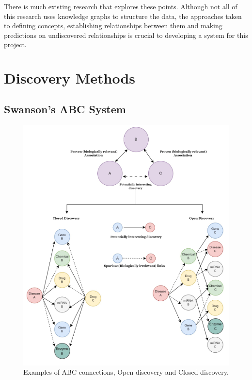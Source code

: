 \documentclass{l4proj}
\begin{document}
There is much existing research that explores these points. Although not all of this research uses knowledge graphs to structure the data, the approaches taken to defining concepts, establishing relationships between them and making predictions on undiscovered relationships is crucial to developing a system for this project. \\

\section{Discovery Methods}

\subsection{Swanson's ABC System}

\begin{figure}
    \centering
    \includegraphics[width=\linewidth]{images/abc_open_closed.png}
    \caption{Examples of ABC connections, Open discovery and Closed discovery. \citep{bhasuran_literature_2023}}
    \label{fig:open_closed}
\end{figure}
\end{document}

